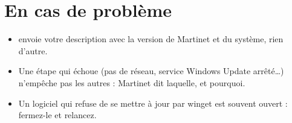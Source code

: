 \section{En cas de problème}

\begin{itemize}
\item {} envoie votre description avec la version de Martinet et du
système, rien d'autre.
\item Une étape qui échoue (pas de réseau, service Windows Update arrêté…) n'empêche pas les autres :
Martinet dit laquelle, et pourquoi.
\item Un logiciel qui refuse de se mettre à jour par winget est souvent ouvert : fermez-le et relancez.
\end{itemize}


